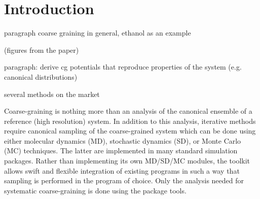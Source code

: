 \chapter{Introduction}

\denis

paragraph coarse graining in general, ethanol as an example

(figures from the paper)

paragraph: derive cg potentials that reproduce properties of the system (e.g. canonical distributions)

several methods on the market 

Coarse-graining is nothing more than an analysis of the canonical ensemble of a reference (high resolution) system. In addition to this analysis, iterative methods require canonical sampling of the coarse-grained system which can be done using either molecular dynamics (MD), stochastic dynamics (SD), or Monte Carlo (MC) techniques. The latter are implemented in many standard simulation packages. Rather than implementing its own MD/SD/MC modules, the toolkit allows swift and flexible integration of existing  programs in such a way that sampling is performed in the program of choice. Only the analysis needed for systematic coarse-graining is done using the package tools.
